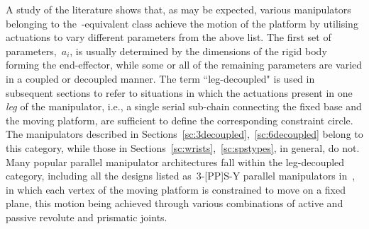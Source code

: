 \documentclass[DD]{iitmdiss}
\newcommand{\mref}[1]{\ref{#1}}
\newcommand{\mcite}[1]{\cite{#1}}
\begin{document}
A study of the literature shows that, as may be expected, various manipulators belonging to the~\rps-equivalent class achieve the motion of the platform by utilising actuations to vary different parameters from the above list. The first set of parameters,~$a_i$, is usually determined by the dimensions of the rigid body forming the end-effector, while some or all of the remaining parameters are varied in a coupled or decoupled manner. The term ``leg-decoupled" is used in subsequent sections to refer to situations in which the actuations present in one \emph{leg} of the manipulator, i.e., a single serial sub-chain connecting the fixed base and the moving platform, are sufficient to define the corresponding constraint circle. The manipulators described in Sections~\mref{sc:3decoupled},~\mref{sc:6decoupled} belong to this category, while those in Sections~\mref{sc:wrists},~\mref{sc:spstypes}, in general, do not. %
Many popular parallel manipulator architectures fall within the leg-decoupled category, including all the designs listed as~3-[PP]S-Y parallel manipulators in~\mcite{nayak2018b}, in which each vertex of the moving platform is constrained to move on a fixed plane, this motion being achieved through various combinations of active and passive revolute and prismatic joints.
%
\end{document}

